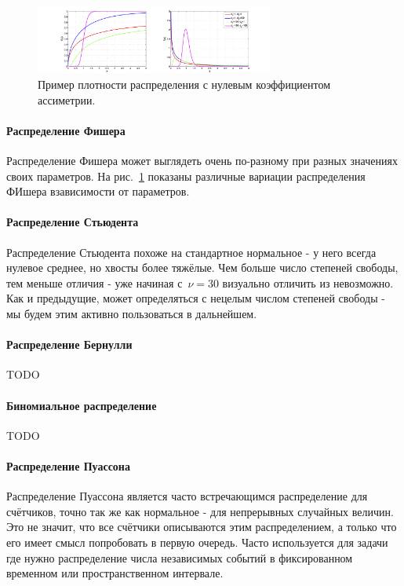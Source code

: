 \begin{figure}[!htb]\center
\includegraphics[width=0.7\textwidth]{lectures/lect1/src/fish.png}
\caption{Пример плотности распределения с нулевым коэффициентом ассиметрии.}
\label{fg:lect1:fig-4}
\end{figure}
\paragraph{Распределение Фишера} Распределение Фишера может выглядеть очень по-разному при разных значениях своих параметров. На рис.~\ref{fg:lect1:fig-4} показаны различные вариации распределения ФИшера взависимости от параметров.

\paragraph{Распределение Стьюдента} Распределение Стьюдента похоже на стандартное нормальное - у него всегда нулевое среднее, но хвосты более тяжёлые. Чем больше число степеней свободы, тем меньше отличия - уже начиная с~$\nu=30$ визуально отличить из невозможно. Как и предыдущие, может определяться с нецелым числом степеней свободы - мы будем этим активно пользоваться в дальнейшем.

\paragraph{Распределение Бернулли} TODO

\paragraph{Биномиальное распределение} TODO

\paragraph{Распределение Пуассона} Распределение Пуассона является часто встречающимся распределение для счётчиков, точно так же как нормальное - для непрерывных случайных величин. Это не значит, что все счётчики описываются этим распределением, а только что его имеет смысл попробовать в первую очередь. Часто используется для задачи где нужно распределение числа независимых событий в фиксированном временном или пространственном интервале.

